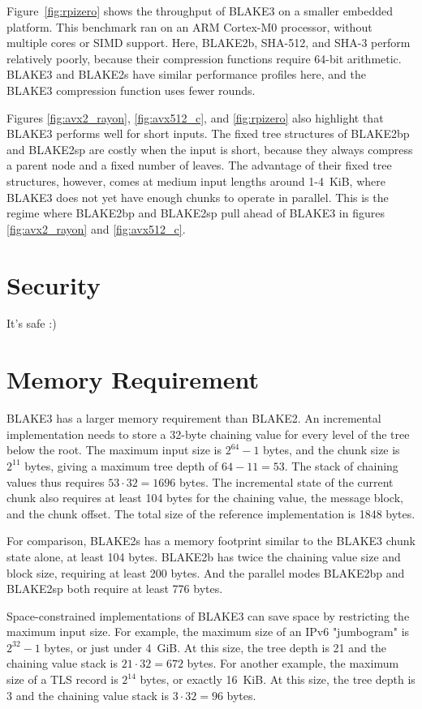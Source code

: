 \documentclass[11pt,notitlepage,a4paper]{article}
\begin{document}
Figure~\ref{fig:rpizero} shows the throughput of BLAKE3 on a smaller embedded
platform. This benchmark ran on an ARM Cortex-M0 processor, without multiple
cores or SIMD support. Here, BLAKE2b, SHA-512, and SHA-3 perform relatively
poorly, because their compression functions require 64-bit arithmetic. BLAKE3
and BLAKE2s have similar performance profiles here, and the BLAKE3 compression
function uses fewer rounds.

Figures \ref{fig:avx2_rayon}, \ref{fig:avx512_c}, and \ref{fig:rpizero} also
highlight that BLAKE3 performs well for short inputs. The fixed tree structures
of BLAKE2bp and BLAKE2sp are costly when the input is short, because they
always compress a parent node and a fixed number of leaves. The advantage of
their fixed tree structures, however, comes at medium input lengths around
1-4~KiB, where BLAKE3 does not yet have enough chunks to operate in parallel.
This is the regime where BLAKE2bp and BLAKE2sp pull ahead of BLAKE3 in figures
\ref{fig:avx2_rayon} and \ref{fig:avx512_c}.

\section{Security}\label{sec:security}

It's safe :)

\section{Memory Requirement}\label{sec:memory}

BLAKE3 has a larger memory requirement than BLAKE2. An incremental
implementation needs to store a 32-byte chaining value for every level of the
tree below the root. The maximum input size is $2^{64}-1$ bytes, and the chunk
size is $2^{11}$ bytes, giving a maximum tree depth of $64 - 11 = 53$. The
stack of chaining values thus requires $53 \cdot 32 = 1696$ bytes. The
incremental state of the current chunk also requires at least 104 bytes for the
chaining value, the message block, and the chunk offset. The total size of the
reference implementation is 1848 bytes.

For comparison, BLAKE2s has a memory footprint similar to the BLAKE3 chunk
state alone, at least 104 bytes. BLAKE2b has twice the chaining value size and
block size, requiring at least 200 bytes. And the parallel modes BLAKE2bp and
BLAKE2sp both require at least 776 bytes.

Space-constrained implementations of BLAKE3 can save space by restricting the
maximum input size. For example, the maximum size of an IPv6 "jumbogram" is
$2^{32}-1$ bytes, or just under 4~GiB. At this size, the tree depth is 21 and
the chaining value stack is $21 \cdot 32 = 672$ bytes. For another example, the
maximum size of a TLS record is $2^{14}$ bytes, or exactly 16~KiB. At this
size, the tree depth is 3 and the chaining value stack is $3 \cdot 32 = 96$
bytes.
\end{document}

